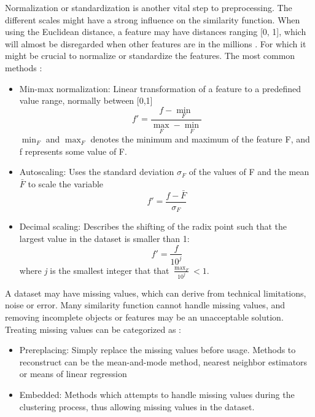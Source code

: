 \documentclass[a4paper,10pt]{article}
\theoremstyle{plain}
\theoremstyle{definition}
\begin{document}
Normalization or standardization is another vital step to preprocessing. The different scales might have a strong influence on the similarity function. When using the Euclidean distance, a feature may have distances ranging [0, 1], which will almost be disregarded when other features are in the millions \cite{33overview}. For which it might be crucial to normalize or standardize the features. The most common methods \cite{34overview, 35overview}:
\begin{itemize}
	\item Min-max normalization: Linear transformation of a feature to a predefined value range, normally between [0,1]
		\begin{equation}
			f' = \frac{f - \min_F}{\max_F - \min_F}
		\end{equation}
		$\min_F$ and $\max_F$ denotes the minimum and maximum of the feature F, and f represents some value of F.
	\item Autoscaling: Uses the standard deviation $\sigma_F$ of the values of F and the mean $\bar{F}$ to scale the variable
		\begin{equation}
			f' = \frac{f - \bar{F}}{\sigma_F}
		\end{equation}
	\item Decimal scaling: Describes the shifting of the radix point such that the largest value in the dataset is smaller than 1:
		\begin{equation}
			f' = \frac{f}{10^j}
		\end{equation}
		where \textit{j} is the smallest integer that that $\frac{\max_F}{10^j} < 1$.
\end{itemize}

A dataset may have missing values, which can derive from technical limitations, noise or error. Many similarity function cannot handle missing values, and removing incomplete objects or features may be an unacceptable solution. Treating missing values can be categorized as \cite{36overview}:
\begin{itemize}
	\item Prereplacing: Simply replace the missing values before usage. Methods to reconstruct can be the mean-and-mode method, nearest neighbor estimators or means of linear regression
	\item Embedded: Methods which attempts to handle missing values during the clustering process, thus allowing missing values in the dataset.
\end{itemize}

\end{document}
